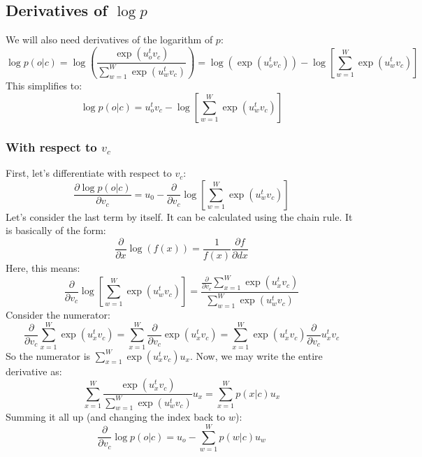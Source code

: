 \documentclass[12pt, a4paper]{article}
\numberwithin{equation}{section}
\begin{document}
\subsection{Derivatives of $\log p$}
We will also need derivatives of the logarithm of $p$:
\begin{equation}
\log p(o|c)=\log\left(\frac{\exp(u_o^t v_c)}{\sum_{w=1}^W\exp(u_w^t v_c)}\right)=\log(\exp(u_o^t v_c))-\log\left[\sum_{w=1}^W\exp(u_w^t v_c)\right]
\end{equation}
This simplifies to:
\begin{equation}
\log p(o|c)=u_o^t v_c-\log\left[\sum_{w=1}^W\exp(u_w^t v_c)\right]
\end{equation}

\subsubsection{With respect to $v_c$}
First, let's differentiate with respect to $v_c$:
\begin{equation}
\frac{\partial\log p(o|c)}{\partial v_c}=u_0-\frac{\partial}{\partial v_c}\log\left[\sum_{w=1}^W\exp(u_w^t v_c)\right]
\end{equation}
Let's consider the last term by itself. It can be calculated using the chain rule. It is basically of the form:
\begin{equation}
\label{log_derivative}
\frac{\partial}{\partial x}\log(f(x))=\frac{1}{f(x)}\frac{\partial f}{\partial dx}
\end{equation}
Here, this means:
\begin{equation}
\frac{\partial}{\partial v_c}\log\left[\sum_{w=1}^W\exp(u_w^t v_c)\right]=\frac{\frac{\partial}{\partial v_c}\sum_{x=1}^W\exp(u_x^t v_c)}{\sum_{w=1}^W\exp(u_w^t v_c)}
\end{equation}
Consider the numerator:
\begin{equation}
\frac{\partial}{\partial v_c}\sum_{x=1}^W\exp(u_x^t v_c)=\sum_{x=1}^W\frac{\partial}{\partial v_c}\exp(u_x^t v_c)=\sum_{x=1}^W\exp(u_x^t v_c)\frac{\partial}{\partial v_c}u_x^t v_c
\end{equation}
So the numerator is $\sum_{x=1}^W\exp(u_x^t v_c)u_x$. Now, we may write the entire derivative as:
\begin{equation}
\sum_{x=1}^W\frac{\exp(u_x^t v_c)}{\sum_{w=1}^W\exp(u_w^t v_c)}u_x=\sum_{x=1}^W p(x|c)u_x
\end{equation}
Summing it all up (and changing the index back to $w$):
\begin{equation}
\label{logp_derivative}
\frac{\partial}{\partial v_c}\log p(o|c)=u_o-\sum_{w=1}^W p(w|c)u_w
\end{equation}
\end{document}
